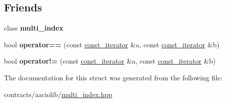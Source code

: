 \subsection*{Friends}
\begin{DoxyCompactItemize}
\item 
\mbox{\label{structaacio_1_1multi__index_1_1const__iterator_a474ad2ee1333aa717a29bb55a9d5fc44}} 
class {\bfseries multi\+\_\+index}
\item 
\mbox{\label{structaacio_1_1multi__index_1_1const__iterator_ab0ac7de651351823aece097eb3be1cfb}} 
bool {\bfseries operator==} (const \mbox{\hyperlink{structaacio_1_1multi__index_1_1const__iterator}{const\+\_\+iterator}} \&a, const \mbox{\hyperlink{structaacio_1_1multi__index_1_1const__iterator}{const\+\_\+iterator}} \&b)
\item 
\mbox{\label{structaacio_1_1multi__index_1_1const__iterator_a5fbca5b71055f2b793ae1607239b13a0}} 
bool {\bfseries operator!=} (const \mbox{\hyperlink{structaacio_1_1multi__index_1_1const__iterator}{const\+\_\+iterator}} \&a, const \mbox{\hyperlink{structaacio_1_1multi__index_1_1const__iterator}{const\+\_\+iterator}} \&b)
\end{DoxyCompactItemize}


The documentation for this struct was generated from the following file\+:\begin{DoxyCompactItemize}
\item 
contracts/aaciolib/\mbox{\hyperlink{multi__index_8hpp}{multi\+\_\+index.\+hpp}}\end{DoxyCompactItemize}
